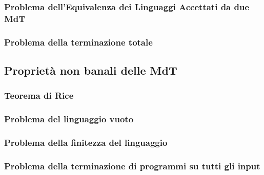 \documentclass{article}  %
\theoremstyle{definition}
\begin{document}
\subsubsection{Problema dell'Equivalenza dei Linguaggi Accettati da due MdT}
\subsubsection{Problema della terminazione totale}
\subsection{Proprietà non banali delle MdT}
\subsubsection{Teorema di Rice}
\subsubsection{Problema del linguaggio vuoto}
\subsubsection{Problema della finitezza del linguaggio}
\subsubsection{Problema della terminazione di programmi su tutti gli input}

\break
\end{document}
